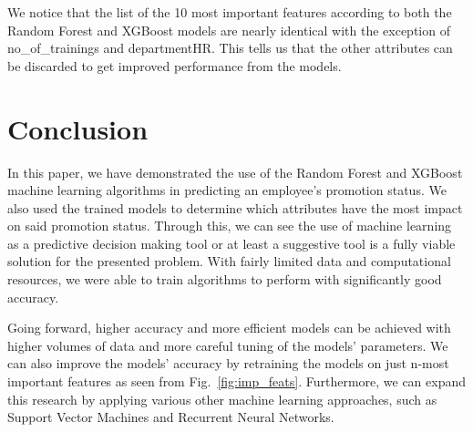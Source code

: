 \documentclass[runningheads]{llncs}
\begin{document}
\newpage

We notice that the list of the 10 most important features according to
both the Random Forest and XGBoost models are nearly identical with the
exception of no\_of\_trainings and departmentHR. This tells us that the
other attributes can be discarded to get improved performance from the
models.

\newpage

\hypertarget{conclusion}{%
\section{Conclusion}\label{conclusion}}

In this paper, we have demonstrated the use of the Random Forest and
XGBoost machine learning algorithms in predicting an employee's
promotion status. We also used the trained models to determine which
attributes have the most impact on said promotion status. Through this,
we can see the use of machine learning as a predictive decision making
tool or at least a suggestive tool is a fully viable solution for the
presented problem. With fairly limited data and computational resources,
we were able to train algorithms to perform with significantly good
accuracy.

Going forward, higher accuracy and more efficient models can be achieved
with higher volumes of data and more careful tuning of the models'
parameters. We can also improve the models' accuracy by retraining the
models on just n-most important features as seen from
Fig.~\ref{fig:imp_feats}. Furthermore, we can expand this research by
applying various other machine learning approaches, such as Support
Vector Machines and Recurrent Neural Networks.
\end{document}
